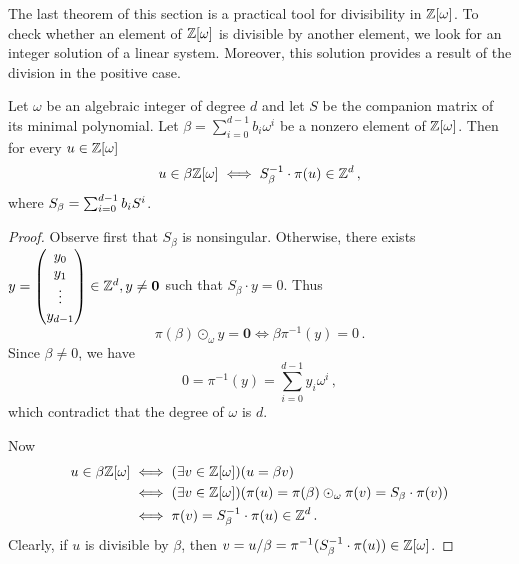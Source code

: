 The last theorem of this section is a practical tool for divisibility in $\mathbb{Z}[\omega]$. To check whether an element of $\mathbb{Z}[\omega]$ is divisible by another element, we look for an integer solution of a linear system. Moreover, this solution provides a result of the division in the positive case. 
\begin{theo}
\label{thm:divisibility}
Let $\omega$ be an algebraic integer of degree $d$ and let $S$ be the companion matrix of its minimal polynomial. Let $\beta=\sum_{i=0}^{d-1} b_i \omega^i$ be a nonzero element of $\mathbb{Z}[\omega]$. Then for every $u\in\mathbb{Z}[\omega]$
$$
u\in\beta\mathbb{Z}[\omega] \iff S_\beta^{-1}\cdot \pi(u) \in \mathbb{Z}^d\,,
$$
where $S_\beta=\sum_{i=0}^{d-1} {b}_i S^i$.
\end{theo}
\begin{proof}
Observe first that $S_\beta$ is nonsingular. Otherwise, there exists $y=\begin{pmatrix} {y}_0 \\ {y}_1 \\ \vdots \\ {y}_{d-1} \end{pmatrix} \in \mathbb{Z}^d, y\neq \mathbf{0}$ such that $S_\beta \cdot y=0$. Thus
$$
\pi(\beta)\odot_\omega y=\mathbf{0} \iff \beta \pi^{-1}(y)=0\,.
$$
Since $\beta\neq 0$, we have
$$
0=\pi^{-1}(y)=\sum_{i=0}^{d-1} y_i \omega^i\,,
$$
which contradict that the degree of $\omega$ is $d$.

Now
\begin{align*}
u\in\beta\mathbb{Z}[\omega] &\iff (\exists v \in \mathbb{Z}[\omega])(u=\beta v)\\
    &\iff  (\exists v \in \mathbb{Z}[\omega])(\pi(u)=\pi(\beta)\odot_\omega\pi(v)=S_\beta \cdot \pi(v))\\
    &\iff \pi(v)=S_\beta^{-1} \cdot \pi(u) \in \mathbb{Z}^d\,.
\end{align*} 
Clearly, if $u$ is divisible by $\beta$, then $v=u/\beta= \pi^{-1}(S_\beta^{-1} \cdot \pi(u))\in\mathbb{Z}[\omega]$.
\end{proof}























  
   